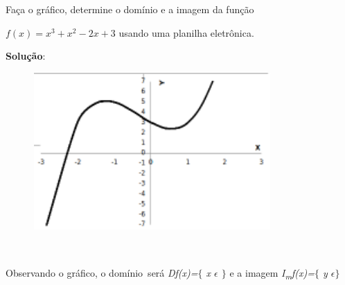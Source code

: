 \begin{texemplo}
Faça o gráfico, determine o domínio e a imagem da função 

\quad  \( f \left( x \right) =x^{3}+x^{2}-2x+3 \) usando uma planilha eletrônica.

\textbf{Solução}: 

\begin{figure}[H]
	\begin{Center}
		\includegraphics[width=3.57in,height=2.36in]{capitulos/outras_funcoes/media/image21.pdf}
	\end{Center}
\end{figure}

~~

Observando o gráfico, o domínio~será \textit{Df(x)=$ \{ $ x $ \epsilon $ \textbf{ }$ \} $ } e a imagem \textit{I\textsubscript{m}f(x)=$ \{ $ y $ \epsilon \} $ } \qedsymbol{}

\end{texemplo}


